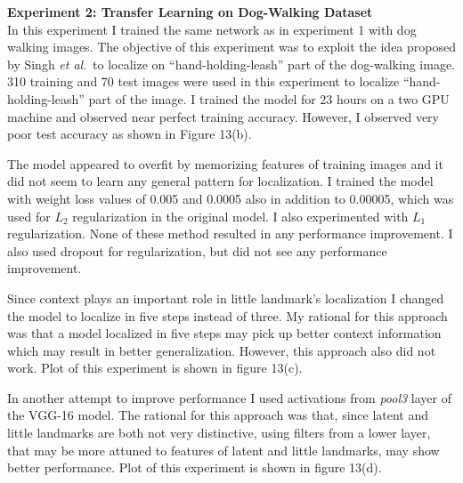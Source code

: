 \documentclass [11pt,letterpaper ,twoside ,openany ]{report}
\begin{document}
    \noindent
    \textbf{Experiment 2: Transfer Learning on Dog-Walking Dataset}\\               
    In this experiment I trained the same network as in experiment 1 with dog walking images. The objective of this experiment was to exploit the idea proposed by Singh \textit{et al}.\ to localize on ``hand-holding-leash'' part of the dog-walking image. 310 training and 70 test images were used in this experiment to localize ``hand-holding-leash'' part of the image. I trained the model for 23 hours on a two GPU machine and observed near perfect training accuracy. However, I observed very poor test accuracy as shown in Figure 13(b).    

    The model appeared to overfit by memorizing features of training images and it did not seem to learn any general pattern for localization. I trained the model with weight loss values of 0.005 and 0.0005 also in addition to 0.00005, which was used for \(L_2\) regularization in the original model. I also experimented with \(L_1\) regularization. None of these method resulted in any performance improvement. I also used dropout \cite{srivastava2014dropout} for regularization, but did not see any performance improvement.

    Since context plays an important role in little landmark's localization I changed the model to localize in five steps instead of three. My rational for this approach was that a model localized in five steps may pick up better context information which may result in better generalization. However, this approach also did not work. Plot of this experiment is shown in figure 13(c).

    In another attempt to improve performance I used activations from \textit{pool3} layer of the VGG-16 model. The rational for this approach was that, since latent and little landmarks are both not very distinctive, using filters from a lower layer, that may be more attuned to features of latent and little landmarks, may show better performance. Plot of this experiment is shown in figure 13(d).\\
\end{document}

